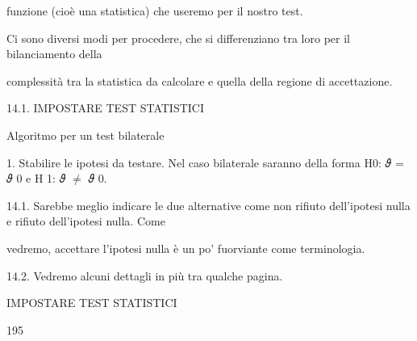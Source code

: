 \documentclass[a4paper,portrait,12pt]{article}
\begin{document}
\begin{flushleft}
funzione (cio\`{e} una statistica) che useremo per il nostro test.
\end{flushleft}


\begin{flushleft}
Ci sono diversi modi per procedere, che si differenziano tra loro per il bilanciamento della
\end{flushleft}


\begin{flushleft}
complessit\`{a} tra la statistica da calcolare e quella della regione di accettazione.
\end{flushleft}





\begin{flushleft}
14.1. IMPOSTARE TEST STATISTICI
\end{flushleft}


\begin{flushleft}
Algoritmo per un test bilaterale
\end{flushleft}


\begin{flushleft}
1. Stabilire le ipotesi da testare. Nel caso bilaterale saranno della forma H0: 𝜗 = 𝜗 0 e H 1: 𝜗 $\neq$ 𝜗 0.
\end{flushleft}


\begin{flushleft}
14.1. Sarebbe meglio indicare le due alternative come non rifiuto dell'ipotesi nulla e rifiuto dell'ipotesi nulla. Come
\end{flushleft}


\begin{flushleft}
vedremo, accettare l'ipotesi nulla \`{e} un po' fuorviante come terminologia.
\end{flushleft}


\begin{flushleft}
14.2. Vedremo alcuni dettagli in più tra qualche pagina.
\end{flushleft}





\begin{flushleft}
 IMPOSTARE TEST STATISTICI
\end{flushleft}





195
\end{document}
